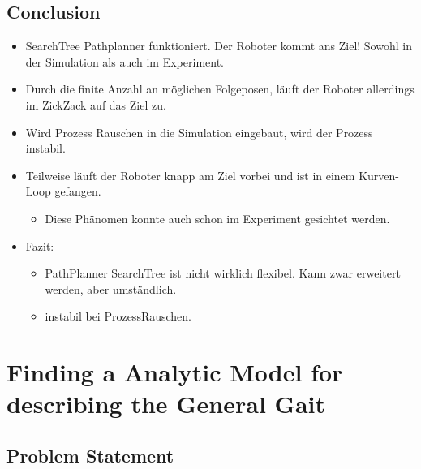 \documentclass[10pt,a4paper]{article}
\begin{document}
\subsection{Conclusion}

\begin{itemize}
	\item SearchTree Pathplanner funktioniert. Der Roboter kommt ans Ziel! Sowohl in der Simulation als auch im Experiment.
	\item Durch die finite Anzahl an möglichen Folgeposen, läuft der Roboter allerdings im ZickZack auf das Ziel zu.
	\item Wird Prozess Rauschen in die Simulation eingebaut, wird der Prozess instabil.
	\item Teilweise läuft der Roboter knapp am Ziel vorbei und ist in einem Kurven-Loop gefangen.
	\begin{itemize}
		\item Diese Phänomen konnte auch schon im Experiment gesichtet werden.
	\end{itemize}
	\item Fazit:
	\begin{itemize}
		\item PathPlanner SearchTree ist nicht wirklich flexibel. Kann zwar erweitert werden, aber umständlich.
		\item instabil bei ProzessRauschen.
	\end{itemize}	 
	
	

\end{itemize}




\section{Finding a Analytic Model for describing the General Gait}

\subsection{Problem Statement}
\end{document}
